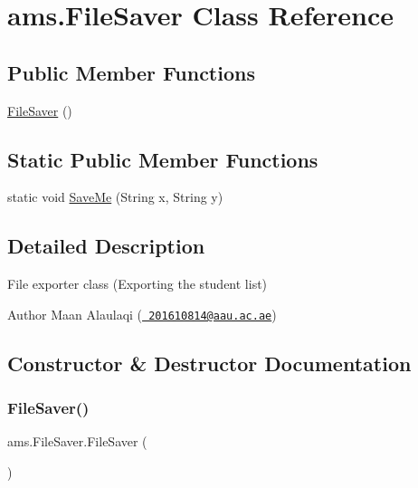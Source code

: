 \hypertarget{classams_1_1_file_saver}{}\section{ams.\+File\+Saver Class Reference}
\label{classams_1_1_file_saver}
\subsection*{Public Member Functions}
\begin{DoxyCompactItemize}
\item 
\mbox{\hyperlink{classams_1_1_file_saver_aa9244b45b67171ba4a8e0b1977dfe636}{File\+Saver}} ()
\end{DoxyCompactItemize}
\subsection*{Static Public Member Functions}
\begin{DoxyCompactItemize}
\item 
static void \mbox{\hyperlink{classams_1_1_file_saver_a925b8d63d7240a7e925f26d8cd0f0988}{Save\+Me}} (String x, String y)
\end{DoxyCompactItemize}


\subsection{Detailed Description}
File exporter class (Exporting the student list)

\begin{DoxyAuthor}{Author}
Maan Alaulaqi (\href{mailto:201610814@aau.ac.ae}{\texttt{ 201610814@aau.\+ac.\+ae}}) 
\end{DoxyAuthor}


\subsection{Constructor \& Destructor Documentation}
\mbox{\label{classams_1_1_file_saver_aa9244b45b67171ba4a8e0b1977dfe636}} 
\subsubsection{\texorpdfstring{FileSaver()}{FileSaver()}}
{\footnotesize\ttfamily ams.\+File\+Saver.\+File\+Saver (\begin{DoxyParamCaption}{ }\end{DoxyParamCaption})}




